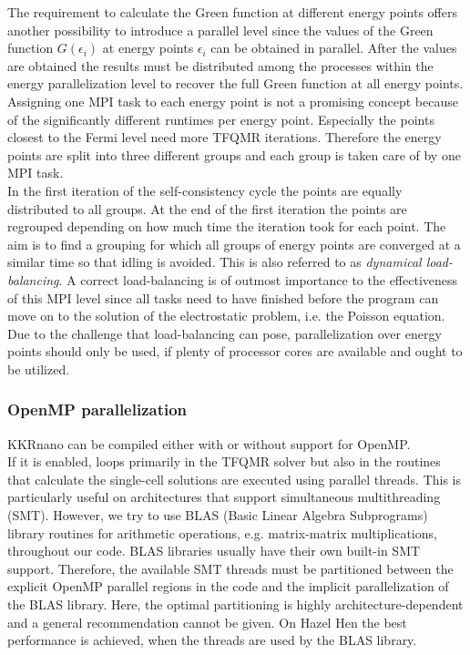 \documentclass [a4paper, 12pt]{article}
\begin{document}
The requirement to calculate the Green function at different energy points offers another possibility to
introduce a parallel level since the values of the Green function $G(\epsilon_i)$ at energy points $\epsilon_i$
can be obtained in parallel.
After the values are obtained the results must be distributed among the processes within
the energy parallelization level to recover the full Green function at all energy points.
\\
Assigning one MPI task to each energy point is not a promising concept because
of the significantly different runtimes per energy point. Especially the points closest to the
Fermi level 
need more TFQMR iterations.
Therefore the energy points are split into three different groups and each group is taken care of by
one MPI task.
\\
In the first iteration of the self-consistency cycle the points are equally distributed to all
groups. At the end of the first iteration the points are regrouped depending on how much time the iteration took
for each point. The aim is to find a grouping for which all groups of energy points are converged at
a similar time so that idling is avoided. This is also referred to as \textit{dynamical load-balancing}.
A correct load-balancing is of outmost importance to the effectiveness of this MPI level since
all tasks need to have finished before the program can move on to the solution of the electrostatic problem,
i.e. the Poisson equation.
Due to the challenge that load-balancing can pose, parallelization over energy points should only be used, 
if plenty of processor cores are available and
ought to be utilized.

\subsubsection*{OpenMP parallelization}

KKRnano can be compiled either with or without support for OpenMP.
\\
If it is enabled,
loops primarily in the TFQMR solver but also in the routines that calculate the single-cell
solutions are executed using parallel threads. 
This is particularly useful on architectures that support simultaneous multithreading (SMT).
However, we try to use BLAS (Basic Linear Algebra Subprograms) library routines for arithmetic
operations, e.g. matrix-matrix multiplications, throughout our code. BLAS libraries usually
have their own built-in SMT support.
Therefore, the available SMT threads must be partitioned between the explicit OpenMP 
parallel regions in the code and the implicit parallelization of the BLAS library.
Here, the optimal partitioning is highly architecture-dependent and a general recommendation cannot
be given. On Hazel Hen the best performance is achieved, when the threads are used by the BLAS library.
\end{document}
